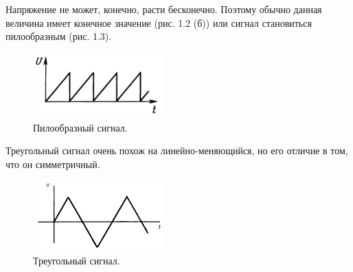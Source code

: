 	Напряжение не может, конечно, расти бесконечно. Поэтому обычно данная величина имеет конечное значение (рис. 1.2 (б)) или сигнал становиться пилообразным (рис. 1.3).

	\begin{figure}[H]
    \centering
    \includegraphics[width=0.45\textwidth]{../image/s_saw.png}
    \caption{Пилообразный сигнал.}
	\end{figure}

	Треугольный сигнал очень похож на линейно-меняющийся, но его отличие в том, что он симметричный.

	\begin{figure}[H]
    \centering
    \includegraphics[width=0.45\textwidth]{../image/s_tri.png}
    \caption{Треугольный сигнал.}
	\end{figure}

%	
%

